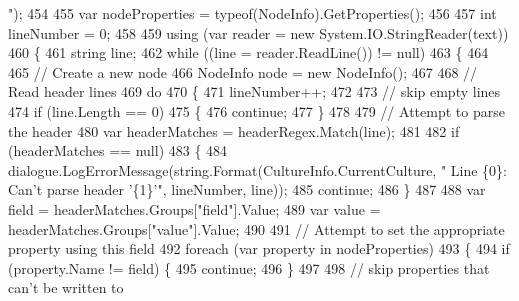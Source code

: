 \begin{DoxyCode}
{      "});
454 
455                     var nodeProperties = typeof(NodeInfo).GetProperties();
456 
457                     \textcolor{keywordtype}{int} lineNumber = 0;
458 
459                     \textcolor{keyword}{using} (var reader = \textcolor{keyword}{new} System.IO.StringReader(text))
460                     \{
461                         \textcolor{keywordtype}{string} line;
462                         \textcolor{keywordflow}{while} ((line = reader.ReadLine()) != null)
463                         \{
464 
465                             \textcolor{comment}{// Create a new node}
466                             NodeInfo node = \textcolor{keyword}{new} NodeInfo();
467 
468                             \textcolor{comment}{// Read header lines}
469                             \textcolor{keywordflow}{do}
470                             \{
471                                 lineNumber++;
472 
473                                 \textcolor{comment}{// skip empty lines}
474                                 \textcolor{keywordflow}{if} (line.Length == 0)
475                                 \{
476                                     \textcolor{keywordflow}{continue};
477                                 \}
478 
479                                 \textcolor{comment}{// Attempt to parse the header}
480                                 var headerMatches = headerRegex.Match(line);
481 
482                                 \textcolor{keywordflow}{if} (headerMatches == null)
483                                 \{
484                                     dialogue.LogErrorMessage(string.Format(CultureInfo.CurrentCulture, \textcolor{stringliteral}{"
      Line \{0\}: Can't parse header '\{1\}'"}, lineNumber, line));
485                                     \textcolor{keywordflow}{continue};
486                                 \}
487 
488                                 var field = headerMatches.Groups[\textcolor{stringliteral}{"field"}].Value;
489                                 var value = headerMatches.Groups[\textcolor{stringliteral}{"value"}].Value;
490 
491                                 \textcolor{comment}{// Attempt to set the appropriate property using this field}
492                                 \textcolor{keywordflow}{foreach} (var property \textcolor{keywordflow}{in} nodeProperties)
493                                 \{
494                                     \textcolor{keywordflow}{if} (property.Name != field) \{
495                                         \textcolor{keywordflow}{continue};
496                                     \}
497 
498                                     \textcolor{comment}{// skip properties that can't be written to}

\end{DoxyCode}
